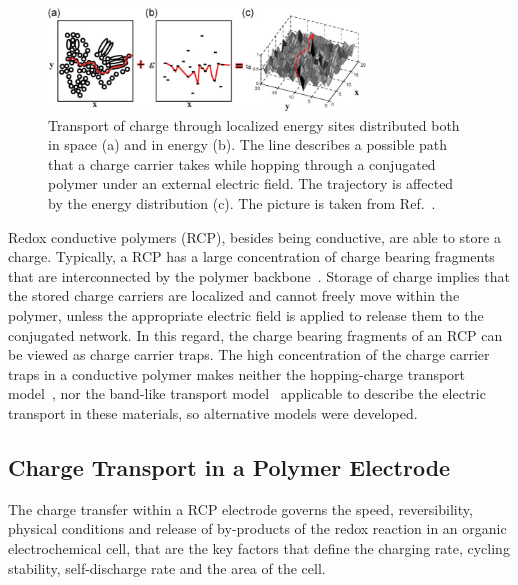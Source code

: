 \begin{figure} [h]
\centering
\includegraphics[width = 0.75\textwidth]{./electrochemistry/figures/hopping.png}
\caption{Transport of charge through localized energy sites distributed both in space (a) and in energy (b). The line describes a possible path that a charge carrier takes while hopping through a conjugated polymer under an external electric field. The trajectory is affected by the energy distribution (c). The picture is taken from Ref.~\cite{Tessler2009}.}
\label{fig:hopping}
\end{figure}

Redox conductive polymers (RCP), besides being conductive, are able to store a charge. Typically, a RCP has a large concentration of charge bearing fragments that are interconnected by the polymer backbone~\cite{Casado_2021_book}. Storage of charge implies that the stored charge carriers are localized and cannot freely move within the polymer, unless the appropriate electric field is applied to release them to the conjugated network. In this regard, the charge bearing fragments of an RCP can be viewed as charge carrier traps. The high concentration of the charge carrier traps in a conductive polymer makes neither the hopping-charge transport model~\cite{Sato2018}, nor the band-like transport model~\cite{Koehler_book} applicable to describe the electric transport in these materials, so alternative models were developed.

\subsection{Charge Transport in a Polymer Electrode}  

\par
The charge transfer within a RCP electrode governs the speed, reversibility, physical conditions and release of by-products of the redox reaction in an organic electrochemical cell, that are the key factors that define the charging rate, cycling stability, self-discharge rate and the area of the cell.\\

